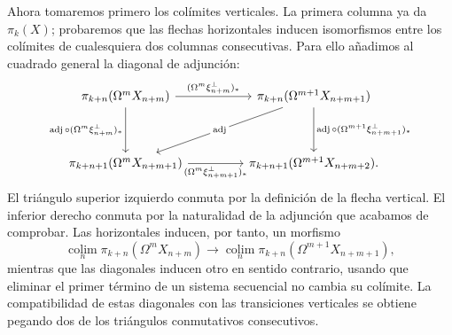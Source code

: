 Ahora tomaremos primero los colímites verticales. La primera columna ya da $\pi_k(X)$; probaremos que las flechas horizontales inducen isomorfismos entre los colímites de cualesquiera dos columnas consecutivas. Para ello añadimos al cuadrado general la diagonal de adjunción:
\[
\begin{tikzcd}[column sep=4.5em,row sep=huge]
\pi_{k+n}(\Omega^mX_{n+m})
\arrow[r,"(\Omega^m\xi_{n+m}^{\perp})_*"]
\arrow[d,"\operatorname{adj}\circ(\Omega^m\xi_{n+m}^{\perp})_*"']
& \pi_{k+n}(\Omega^{m+1}X_{n+m+1})
\arrow[dl,"\operatorname{adj}" description]
\arrow[d,"\operatorname{adj}\circ(\Omega^{m+1}\xi_{n+m+1}^{\perp})_*"]\\
\pi_{k+n+1}(\Omega^mX_{n+m+1})
\arrow[r,"(\Omega^m\xi_{n+m+1}^{\perp})_*"']
& \pi_{k+n+1}(\Omega^{m+1}X_{n+m+2}).
\end{tikzcd}
\]
El triángulo superior izquierdo conmuta por la definición de la flecha vertical. El inferior derecho conmuta por la naturalidad de la adjunción que acabamos de comprobar. Las horizontales inducen, por tanto, un morfismo
\[
\operatorname*{colim}_n\pi_{k+n}(\Omega^mX_{n+m})
\longrightarrow
\operatorname*{colim}_n\pi_{k+n}(\Omega^{m+1}X_{n+m+1}),
\]
mientras que las diagonales inducen otro en sentido contrario, usando que eliminar el primer término de un sistema secuencial no cambia su colímite. La compatibilidad de estas diagonales con las transiciones verticales se obtiene pegando dos de los triángulos conmutativos consecutivos.

